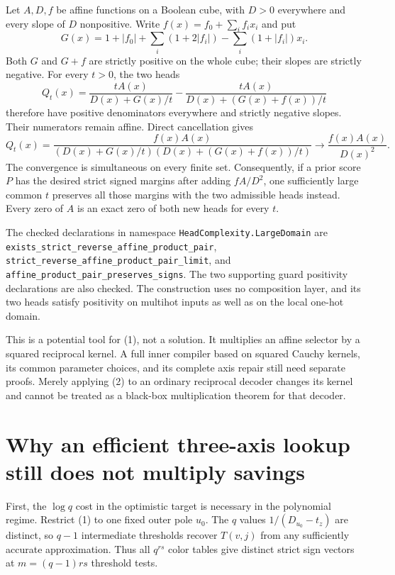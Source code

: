\documentclass[11pt]{article}
\begin{document}
Let $A,D,f$ be affine functions on a Boolean cube, with $D>0$ everywhere
and every slope of $D$ nonpositive. Write $f(x)=f_0+\sum_i f_i x_i$ and put
\[
 G(x)=1+|f_0|+\sum_i(1+2|f_i|)-\sum_i(1+|f_i|)x_i.
\]
Both $G$ and $G+f$ are strictly positive on the whole cube; their slopes
are strictly negative. For every $t>0$, the two heads
\[
 Q_t(x)=\frac{tA(x)}{D(x)+G(x)/t}
       -\frac{tA(x)}{D(x)+(G(x)+f(x))/t}
\]
therefore have positive denominators everywhere and strictly negative
slopes. Their numerators remain affine. Direct cancellation gives
\[
 Q_t(x)=\frac{f(x)A(x)}
 {(D(x)+G(x)/t)(D(x)+(G(x)+f(x))/t)}
 \longrightarrow\frac{f(x)A(x)}{D(x)^2}.
 \tag{2}
\]
The convergence is simultaneous on every finite set. Consequently, if a
prior score $P$ has the desired strict signed margins after adding
$fA/D^2$, one sufficiently large common $t$ preserves all those margins
with the two admissible heads instead. Every zero of $A$ is an exact zero
of both new heads for every $t$.

The checked declarations in namespace \texttt{HeadComplexity.LargeDomain}
are \texttt{exists\_strict\_reverse\_affine\_product\_pair},
\texttt{strict\_reverse\_affine\_product\_pair\_limit}, and
\texttt{affine\_product\_pair\_preserves\_signs}. The two supporting guard
positivity declarations are also checked. The construction uses no
composition layer, and its two heads satisfy positivity on multihot inputs
as well as on the local one-hot domain.

This is a potential tool for (1), not a solution. It multiplies an affine
selector by a squared reciprocal kernel. A full inner compiler based on
squared Cauchy kernels, its common parameter choices, and its complete
axis repair still need separate proofs. Merely applying (2) to an ordinary
reciprocal decoder changes its kernel and cannot be treated as a black-box
multiplication theorem for that decoder.

\section{Why an efficient three-axis lookup still does not multiply savings}

First, the $\log q$ cost in the optimistic target is necessary in the
polynomial regime. Restrict (1) to one fixed outer pole $u_0$. The $q$
values $1/(D_{u_0}-t_z)$ are distinct, so $q-1$ intermediate thresholds
recover $T(v,j)$ from any sufficiently accurate approximation. Thus all
$q^{rs}$ color tables give distinct strict sign vectors at
$m=(q-1)rs$ threshold tests.
\end{document}
